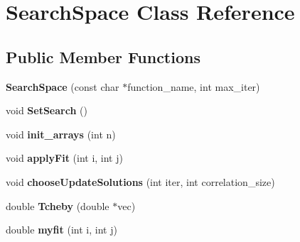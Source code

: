 \hypertarget{class_search_space}{}\section{Search\+Space Class Reference}
\label{class_search_space}
\subsection*{Public Member Functions}
\begin{DoxyCompactItemize}
\item 
\hypertarget{class_search_space_adbe23fed73ebfe505590d08ca35c8540}{}{\bfseries Search\+Space} (const char $\ast$function\+\_\+name, int max\+\_\+iter)\label{class_search_space_adbe23fed73ebfe505590d08ca35c8540}

\item 
\hypertarget{class_search_space_a9290fd291baa13505788520219b13d17}{}void {\bfseries Set\+Search} ()\label{class_search_space_a9290fd291baa13505788520219b13d17}

\item 
\hypertarget{class_search_space_acc3f1cf71ce53085be6e1f8bffbed181}{}void {\bfseries init\+\_\+arrays} (int n)\label{class_search_space_acc3f1cf71ce53085be6e1f8bffbed181}

\item 
\hypertarget{class_search_space_acd2edf2418e75389c5872be03b3c1580}{}void {\bfseries apply\+Fit} (int i, int j)\label{class_search_space_acd2edf2418e75389c5872be03b3c1580}

\item 
\hypertarget{class_search_space_a651cac0361d3064d5dba6d1bd7b90585}{}void {\bfseries choose\+Update\+Solutions} (int iter, int correlation\+\_\+size)\label{class_search_space_a651cac0361d3064d5dba6d1bd7b90585}

\item 
\hypertarget{class_search_space_aa4f6798bd182c59b3d374d7aad8efc63}{}double {\bfseries Tcheby} (double $\ast$vec)\label{class_search_space_aa4f6798bd182c59b3d374d7aad8efc63}

\item 
\hypertarget{class_search_space_a02090c4da47baa7cb92b67fcc54da7ba}{}double {\bfseries myfit} (int i, int j)\label{class_search_space_a02090c4da47baa7cb92b67fcc54da7ba}

\end{DoxyCompactItemize}
